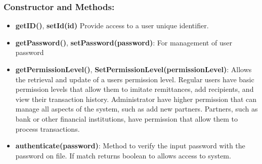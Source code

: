 \documentclass[onecolumn, letterpaper, ]{report}
\begin{document}
            \subsubsection{Constructor and Methods:}
            \begin{itemize}
                \item \textbf{getID()}, \textbf{setId(id)} Provide access to a user unique identifier.
                \item \textbf{getPassword()}, \textbf{setPassword(password)}: For management of user password
                \item \textbf{getPermissionLevel()}, \textbf{SetPermissionLevel(permissionLevel)}: Allows the retrieval and update of a users permission level. Regular users have basic permission levels that allow them  to imitate remittances, add recipients, and view their transaction history. Administrator have higher permission that can manage all aspects of the system, such as add new partners. Partners, such as bank or other financial institutions, have permission that allow them to process transactions.
                \item \textbf{authenticate(password)}: Method to verify the input password with the password on file. If match returns boolean to allows access to system.
                
            \end{itemize}
\end{document}
